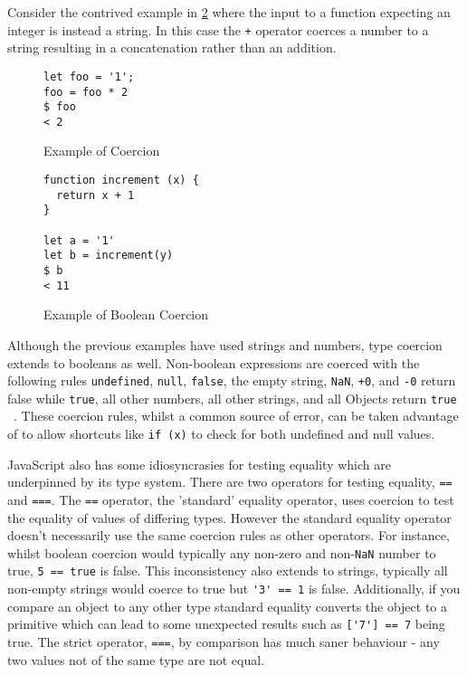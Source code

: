 \documentclass[]{final_report}
\begin{document}
Consider the contrived example in \ref{fig:js-bool-coercion} where the input to a function expecting an integer is instead a string. In this case the \lstinline{+} operator coerces a number to a string resulting in a concatenation rather than an addition.

\begin{figure}[h]
\begin{verbatim}
let foo = '1';
foo = foo * 2
$ foo
< 2
\end{verbatim}
\caption{\label{fig:js-coercion} Example of Coercion}
\end{figure} 

\begin{figure}[h]
\begin{verbatim}
function increment (x) {
  return x + 1
}

let a = '1'
let b = increment(y)
$ b
< 11
\end{verbatim}
\caption{\label{fig:js-bool-coercion} Example of Boolean Coercion}
\end{figure} 

Although the previous examples have used strings and numbers, type coercion extends to booleans as well. Non-boolean expressions are coerced with the following rules \lstinline{undefined}, \lstinline{null}, \lstinline{false}, the empty string, \lstinline{NaN}, \lstinline{+0}, and \lstinline{-0}  return false while \lstinline{true}, all other numbers, all other strings, and all Objects return \lstinline{true} ~\cite{EcmaScript}. These coercion rules, whilst a common source of error, can be taken advantage of to allow shortcuts like \lstinline{if (x)} to check for both undefined and null values.

JavaScript also has some idiosyncrasies for testing equality which are underpinned by its type system. There are two operators for testing equality, \lstinline{==} and \lstinline{===}.  The \lstinline{==} operator, the 'standard' equality operator, uses coercion to test the equality of values of differing types. However the standard equality operator doesn't necessarily use the same coercion rules as other operators. For instance, whilst boolean coercion would typically any non-zero and non-\lstinline{NaN} number to true,  \lstinline{5 == true} is false. This inconsistency also extends to strings, typically all non-empty strings would coerce to true but \lstinline{'3' == 1} is false. Additionally, if you compare an object to any other type standard equality converts the object to a primitive which can lead to some unexpected results such as \lstinline{['7'] == 7}  being true. The strict operator, \lstinline{===}, by comparison has much saner behaviour - any two values not of the same type are not equal.
\end{document}
